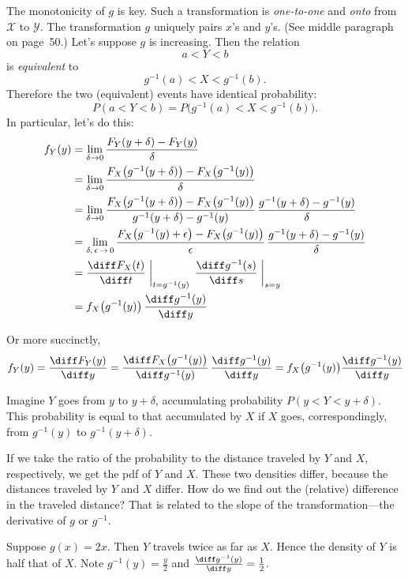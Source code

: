 \documentclass[12pt]{article}
\begin{document}
The monotonicity of $g$ is key.
Such a transformation is \emph{one-to-one} and \emph{onto}
from $\mathcal{X}$ to $\mathcal{Y}$.
The transformation $g$ uniquely pairs $x$'s and $y$'s.
(See middle paragraph on page~50.)
Let's suppose $g$ is increasing.
Then the relation
\[
a < Y < b
\]
is \emph{equivalent} to
\[
g^{-1}(a) < X < g^{-1}(b).
\]
Therefore the two (equivalent) events have identical probability:
\[
P(a < Y < b)
= P\bigl(g^{-1}(a) < X < g^{-1}(b)\bigr)
.
\]
In particular, let's do this:
\[\begin{split}
f_Y(y)
&= \lim_{\delta \to 0}
    \frac{F_Y(y + \delta) - F_Y(y)}{\delta}
\\
&= \lim_{\delta \to 0}
    \frac{F_X\bigl(g^{-1}(y + \delta)\bigr) -
            F_X\bigl(g^{-1}(y)\bigr)}
        {\delta}
\\
&= \lim_{\delta \to 0}
    \frac{F_X\bigl(g^{-1}(y + \delta)\bigr) -
            F_X\bigl(g^{-1}(y)\bigr)}
        {g^{-1}(y + \delta) - g^{-1}(y)}
    \,
    \frac{g^{-1}(y + \delta) - g^{-1}(y)}
        {\delta}
\\
&= \lim_{\delta,\,\epsilon\, \to\, 0}
    \frac{F_X\bigl(g^{-1}(y) + \epsilon\bigr) -
            F_X\bigl(g^{-1}(y)\bigr)}
        {\epsilon}
    \,
    \frac{g^{-1}(y + \delta) - g^{-1}(y)}
        {\delta}
\\
&= \frac{\diff F_X(t)}{\diff t}\biggm|_{t = g^{-1}(y)}
    \,
   \frac{\diff g^{-1}(s)}{\diff s}\biggm|_{s = y}
\\
&= f_X\bigl(g^{-1}(y)\bigr)\, \frac{\diff g^{-1}(y)}{\diff y}
\end{split}
\]

Or more succinctly,
\[
f_Y(y)
= \frac{\diff F_Y(y)}{\diff y}
= \frac{\diff F_X\bigl(g^{-1}(y)\bigr)}{\diff g^{-1}(y)}
    \,
  \frac{\diff g^{-1}(y)}{\diff y}
= f_X\bigl(g^{-1}(y)\bigr) \frac{\diff g^{-1}(y)}{\diff y}
\]

Imagine $Y$ goes from $y$ to $y + \delta$,
accumulating probability $P(y < Y < y + \delta)$.
This probability is equal to that accumulated by $X$
if $X$ goes, correspondingly,
from $g^{-1}(y)$ to $g^{-1}(y + \delta)$.

If we take the ratio of the probability to the distance traveled
by $Y$ and $X$, respectively,
we get the pdf of $Y$ and $X$.
These two densities differ, because the distances traveled by $Y$ and
$X$ differ.
How do we find out the (relative) difference in the traveled distance?
That is related to the slope of the transformation---the derivative of
$g$ or $g^{-1}$.


Suppose $g(x) = 2x$.
Then $Y$ travels twice as far as $X$.
Hence the density of $Y$ is half that of $X$.
Note $g^{-1}(y) = \frac{y}{2}$
and $\frac{\diff g^{-1}(y)}{\diff y} = \frac{1}{2}$.
\end{document}
